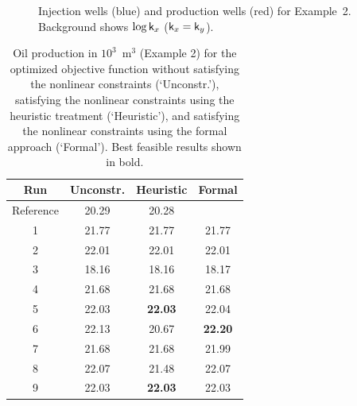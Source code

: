 \documentclass[twocolumn,numbook]{svjour3}          %
\begin{document}
\begin{figure}[ht]
\begin{center}

\end{center}
     \caption{Injection wells (blue) and production wells (red) for Example~2. Background shows $\log \mathsf{k}_x$ ($\mathsf{k}_x = \mathsf{k}_y$).}
  \label{fig:PermeabilityMapAndWellsSpe10Top}
\end{figure}
%

\begin{table}
\centering
\caption{Oil production in $10^3$~m$^3$ (Example 2) for the optimized objective function
         without satisfying the nonlinear constraints (`Unconstr.'), satisfying the nonlinear constraints
         using the heuristic treatment (`Heuristic'), and satisfying the nonlinear constraints
         using the formal approach (`Formal'). Best feasible results shown in bold.}
\begin{tabular}{|c|c|c|c|}
\hline
  Run            &  Unconstr. & Heuristic & Formal      \\
\hline
Reference        & 20.29         &     20.28         & 	         \\
1 & 21.77      &     21.77         &       21.77    \\
2 & 22.01      &     22.01         &       22.01    \\
3 & 18.16      &     18.16         &       18.17    \\
4 & 21.68      &     21.68         &       21.68    \\
5 & 22.03      & \bf{22.03}      &       22.04    \\
6 & 22.13      &     20.67         &  \bf{22.20}    \\
7 & 21.68      &     21.68         &       21.99    \\
8 & 22.07      &     21.48         &       22.07    \\
9 & 22.03      & \bf{22.03}      &       22.03    \\
\hline
\end{tabular}
  \label{table:spe10top}
\end{table}

\end{document}
